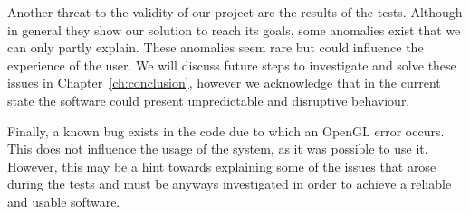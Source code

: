 Another threat to the validity of our project are the results of the tests. Although in general they show our solution to reach its goals, some anomalies exist that we can only partly explain. These anomalies seem rare but could influence the experience of the user. We will discuss future steps to investigate and solve these issues in Chapter~\ref{ch:conclusion}, however we acknowledge that in the current state the software could present unpredictable and disruptive behaviour.

Finally, a known bug exists in the code due to which an OpenGL error occurs. This does not influence the usage of the system, as it was possible to use it. However, this may be a hint towards explaining some of the issues that arose during the tests and must be anyways investigated in order to achieve a reliable and usable software.
